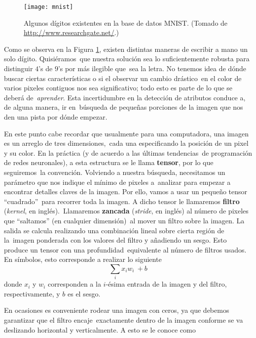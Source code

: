 \begin{figure}
  \centering
  \texttt{[image: mnist]}
  \caption{Algunos dígitos existentes en la base de datos MNIST.
    (Tomado de \url{http://www.researchgate.net/}.)}
  \label{mnist_fig}
\end{figure}

Como se observa en la Figura \ref{mnist_fig}, existen distintas maneras de escribir a mano un solo dígito. Quisiéramos\
que nuestra solución sea lo suficientemente robusta para distinguir $4$'s de $9$'s por más ilegible que\
sea la letra. No tenemos idea de dónde buscar ciertas características o si el observar un cambio drástico\
en el color de varios pixeles contiguos nos sea significativo; todo esto es parte de lo que se deberá de\
\emph{aprender}. Esta incertidumbre en la detección de atributos conduce a, de alguna manera, ir en\
búsqueda de pequeñas porciones de la imagen que nos den una pista por dónde empezar.\par
En este punto cabe recordar que usualmente para una computadora, una imagen es un arreglo de tres dimensiones,\
cada una especificando la posición de un pixel y su color. En la práctica (y de acuerdo a las últimas tendencias\
de programación de redes neuronales), a esta estructura se le llama \textbf{tensor}, por lo que seguiremos\
la convención. Volviendo a nuestra búsqueda, necesitamos un parámetro que nos indique el mínimo de pixeles a\
analizar para empezar a encontrar detalles claves de la imagen. Por ello, vamos a usar un pequeño tensor ``cuadrado''\
para recorrer toda la imagen. A dicho tensor le llamaremos \textbf{filtro} (\emph{kernel}, en inglés).\
Llamaremos \textbf{zancada} (\emph{stride}, en inglés) al número de pixeles que ``saltamos'' (en cualquier dimensión)\
al mover un filtro sobre la imagen. La salida se calcula realizando una combinación lineal sobre cierta región de la\
imagen ponderada con los valores del filtro y añadiendo un sesgo. Esto produce un tensor con una profundidad\
equivalente al número de filtros usados. En símbolos, esto corresponde a realizar lo siguiente
\begin{equation} \label{entry-wise-sum}
  \sum _{i} x_i w_i\ + b
\end{equation}
donde $x_i$ y $w_i$ corresponden a la $i$-ésima entrada de la imagen y del filtro, respectivamente, y $b$ es el sesgo.\par
En ocasiones es conveniente rodear una imagen con ceros, ya que debemos garantizar que el filtro encaje\
exactamente dentro de la imagen conforme se va deslizando horizontal y verticalmente. A esto se le conoce como\
